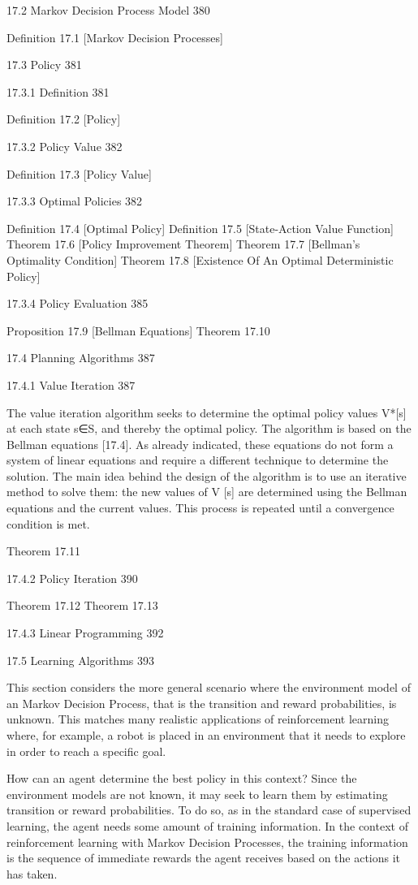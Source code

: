 17.2 Markov Decision Process Model 380

Definition 17.1 [Markov Decision Processes]

17.3 Policy 381



17.3.1 Definition 381

Definition 17.2 [Policy]

17.3.2 Policy Value 382

Definition 17.3 [Policy Value]

17.3.3 Optimal Policies 382

Definition 17.4 [Optimal Policy]
Definition 17.5 [State-Action Value Function]
Theorem 17.6 [Policy Improvement Theorem]
Theorem 17.7 [Bellman's Optimality Condition]
Theorem 17.8 [Existence Of An Optimal Deterministic Policy]

17.3.4 Policy Evaluation 385

Proposition 17.9 [Bellman Equations]
Theorem 17.10

17.4 Planning Algorithms 387



17.4.1 Value Iteration 387

The value iteration algorithm seeks to determine the optimal policy values V*[s] at each state s∈S, and thereby the optimal policy. The algorithm is based on the Bellman equations [17.4]. As already indicated, these equations do not form a system of linear equations and require a different technique to determine the solution. The main idea behind the design of the algorithm is to use an iterative method to solve them: the new values of V [s] are determined using the Bellman equations and the current values. This process is repeated until a convergence condition is met.

Theorem 17.11

17.4.2 Policy Iteration 390

Theorem 17.12
Theorem 17.13

17.4.3 Linear Programming 392



17.5 Learning Algorithms 393

This section considers the more general scenario where the environment model of an Markov Decision Process, that is the transition and reward probabilities, is unknown. This matches many realistic applications of reinforcement learning where, for example, a robot is placed in an environment that it needs to explore in order to reach a specific goal.

How can an agent determine the best policy in this context? Since the environment models are not known, it may seek to learn them by estimating transition or reward probabilities. To do so, as in the standard case of supervised learning, the agent needs some amount of training information. In the context of reinforcement learning with Markov Decision Processes, the training information is the sequence of immediate rewards the agent receives based on the actions it has taken.

